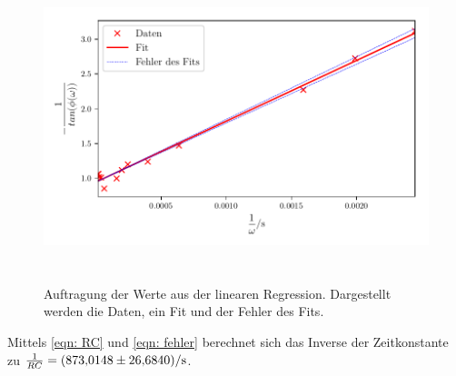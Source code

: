 \begin{figure}
  \centering
  \includegraphics[width=13cm, height=9cm]{build/plotc.pdf}
  \caption{Auftragung der Werte aus der linearen Regression. Dargestellt werden die Daten, ein Fit und der Fehler des Fits.}
  \label{fig:plotc}
\end{figure}

Mittels \eqref{eqn: RC} und \eqref{eqn: fehler} berechnet sich das Inverse der Zeitkonstante zu
$\frac{1}{RC} = \SI{873.0148  \pm 26.684}{\per\second}$.

